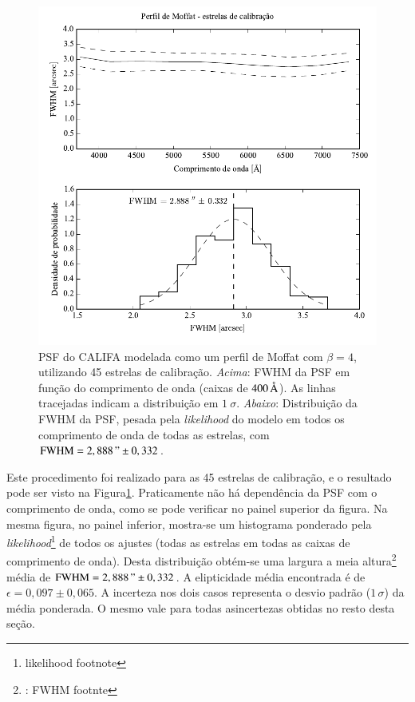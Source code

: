 \begin{figure}
	\includegraphics{figuras/PSFMoffatBeta4_calib}
	\caption[PSF do CALIFA -- estrelas de calibração.]
	{PSF do CALIFA modelada como um perfil de Moffat com $\beta=4$, utilizando 45
	estrelas de calibração. {\em Acima}: FWHM da PSF em função do comprimento de
	onda (caixas de $400\,\text{\normalfont\AA}$). As linhas tracejadas indicam a distribuição
	em $1\ \sigma$. {\em Abaixo}: Distribuição da FWHM da PSF, pesada pela {\em
	likelihood} do modelo em todos os comprimento de onda de todas as estrelas, com
	$\mathrm{FWHM}=2,888\," \pm 0,332$.}
	\label{fig:PSFCalib}
\end{figure}

Este procedimento foi realizado para as 45 estrelas de calibração, e o resultado
pode ser visto na Figura\ref{fig:PSFCalib}. Praticamente não há dependência da
PSF com o comprimento de onda, como se pode verificar no painel superior da
figura. Na mesma figura, no painel inferior, mostra-se um histograma ponderado
pela {\em likelihood}\footnote{likelihood footnote} de todos os ajustes (todas
as estrelas em todas as caixas de comprimento de onda). Desta distribuição
obtém-se uma largura a meia altura\footnote{\TODO: FWHM footnte} média de
$\mathrm{FWHM}=2,888\," \pm 0,332$. A elipticidade média encontrada é de
$\epsilon=0,097 \pm 0,065$. A incerteza nos dois casos representa o desvio
padrão ($1\,\sigma$) da média ponderada. O mesmo vale para todas asincertezas
obtidas no resto desta seção.

